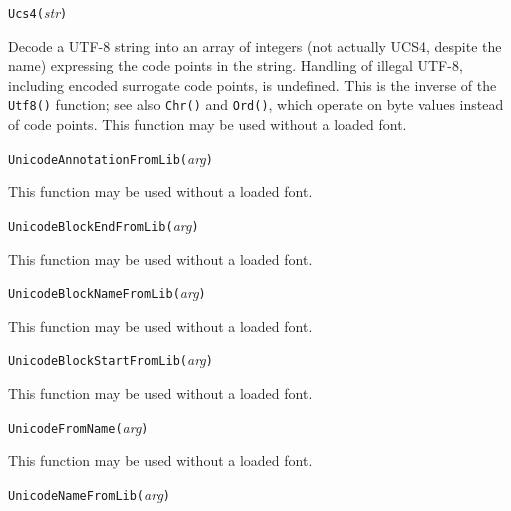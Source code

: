 

\texttt{Ucs4(}\textit{str}\texttt{)}

Decode a UTF-8 string into an array of integers (not actually UCS4, despite
the name) expressing the code points
in the string.  Handling of illegal UTF-8, including encoded surrogate code
points, is undefined.  This is the inverse of the \texttt{Utf8()} function;
see also \texttt{Chr()} and \texttt{Ord()}, which operate on byte values
instead of code points.  This function may be used without a loaded font.



\texttt{UnicodeAnnotationFromLib(}\textit{arg}\texttt{)}

This function may be used without a loaded font.



\texttt{UnicodeBlockEndFromLib(}\textit{arg}\texttt{)}

This function may be used without a loaded font.



\texttt{UnicodeBlockNameFromLib(}\textit{arg}\texttt{)}

This function may be used without a loaded font.



\texttt{UnicodeBlockStartFromLib(}\textit{arg}\texttt{)}

This function may be used without a loaded font.



\texttt{UnicodeFromName(}\textit{arg}\texttt{)}

This function may be used without a loaded font.



\texttt{UnicodeNameFromLib(}\textit{arg}\texttt{)}


